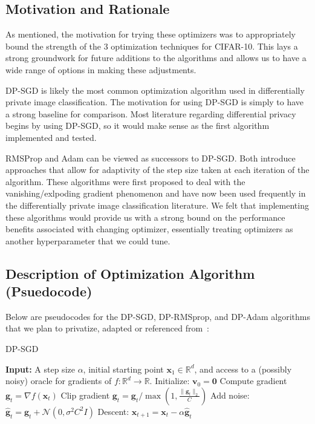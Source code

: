 \subsection{Motivation and Rationale}\label{subsec:motivation-and-rationale}

As mentioned, the motivation for trying these optimizers was to appropriately bound the strength of the 3 optimization techniques for CIFAR-10. 
This lays a strong groundwork for future additions to the algorithms and allows us to have a wide range of options in making these adjustments. 

DP-SGD is likely the most common optimization algorithm used in differentially private image classification. The motivation for using DP-SGD is simply to have a strong 
baseline for comparison. Most literature regarding differential privacy begins by using DP-SGD, so it would make sense as the first algorithm implemented and tested.

RMSProp and Adam can be viewed as successors to DP-SGD. Both introduce approaches that allow for adaptivity of the step size taken at each iteration of the algorithm. These algorithms
were first proposed to deal with the vanishing/exlpoding gradient phenomenon and have now been used frequently in the differentially private image classification literature. We felt that
implementing these algorithms would provide us with a strong bound on the performance benefits associated with changing optimizer, essentially treating optimizers as another hyperparameter
that we could tune.

\subsection{Description of Optimization Algorithm (Psuedocode)}\label{subsec:algorithm-description}

Below are pseudocodes for the DP-SGD, DP-RMSprop, and DP-Adam algorithms that we plan to privatize, adapted or referenced from~\cite{DBLP:journals/corr/abs-1807-06766}:

\begin{algorithm}[H]
    \caption{DP-SGD}
    \label{alg:sgd}
    \begin{algorithmic}[1]
        \State \textbf{Input:} A step size $\alpha$, initial starting point $\mathbf{x}_1 \in \mathbb{R}^d$,
        and access to a (possibly noisy) oracle for gradients of $f : \mathbb{R}^d \rightarrow \mathbb{R}$.
        \State Initialize: $\mathbf{v}_0 = \mathbf{0}$
            \State Compute gradient $\mathbf{g}_t = \nabla f(\mathbf{x}_t)$
            \State Clip gradient $\mathbf{g}_t = \mathbf{g}_t / \max(1, \frac{\lVert \mathbf{g}_t \rVert_2}{C})$
            \State Add noise: $\hat{\mathbf{g}}_t = \mathbf{g}_t + \mathcal{N}(0, \sigma^2 C^2 I)$
            \State Descent: $\mathbf{x}_{t+1} = \mathbf{x}_t - \alpha \hat{\mathbf{g}}_t$
        \EndFor
    \end{algorithmic}
\end{algorithm}

